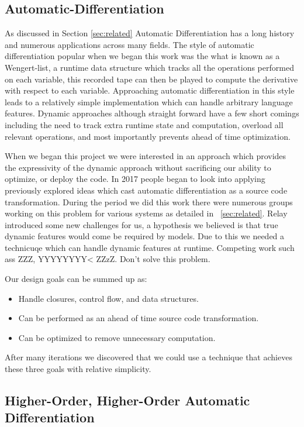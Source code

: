\subsection{Automatic-Differentiation}

As discussed in Section \ref{sec:related} Automatic Differentiation has a long history
  and numerous applications across many fields.
The style of automatic differentiation popular when we began this work was the
  what is known as a Wengert-list, a runtime data structure which tracks
  all the operations performed on each variable, this recorded tape can then
  be played to compute the derivative with respect to each variable.
Approaching automatic differentiation in this style leads to a relatively simple
  implementation which can handle arbitrary language features.
Dynamic approaches although straight forward have a few short comings
  including the need to track extra runtime state and computation,
  overload all relevant operations, and most importantly prevents
  ahead of time optimization.

When we began this project we were interested in an approach which
  provides the expressivity of the dynamic approach without
  sacrificing our ability to optimize, or deploy the code.
In 2017 people began to look into applying previously explored
  ideas which cast automatic differentiation as a source code
  transformation.
During the period we did this work there were numerous
  groups working on this problem for various systems
  as detailed in ~\ref{sec:related}.
Relay introduced some new challenges for us, a hypothesis we
  believed is that true dynamic features would come be required
  by models.
Due to this we needed a technicuqe which can handle dynamic
  features at runtime.
Competing work such ass ZZZ, YYYYYYYY< ZZzZ.
Don't solve this problem.

Our design goals can be summed up as:
\begin{itemize}
  \item Handle closures, control flow, and data structures.
  \item Can be performed as an ahead of time source code
    transformation.
  \item Can be optimized to remove unnecessary computation.
\end{itemize}

After many iterations we discovered that we could use a
  technique that achieves these three goals with relative
  simplicity.

\subsection{Higher-Order, Higher-Order Automatic Differentiation}
\label{sec:autodiff}

